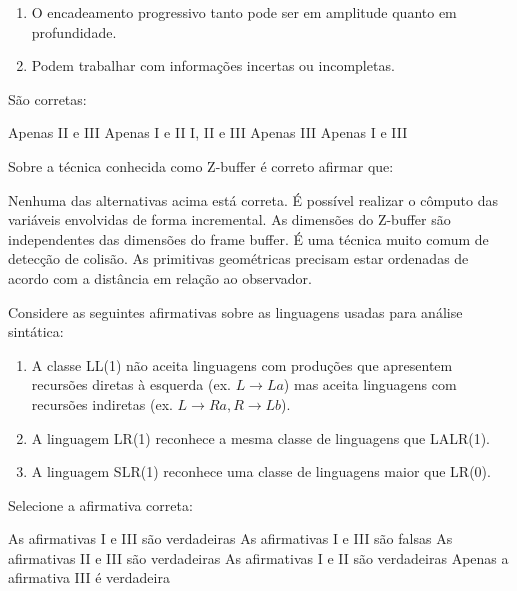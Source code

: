 \documentclass[12pt, addpoints]{exam}
\begin{document}
\begin{questions}
\begin{enumerate}[label=\Roman*.]
    \item O encadeamento progressivo tanto pode ser em amplitude quanto em profundidade.

    \item Podem trabalhar com informações incertas ou incompletas. 

\end{enumerate}

São corretas:
\begin{choices}
\choice Apenas II e III
\choice Apenas I e II
\choice I, II e III
\choice Apenas III
\choice Apenas I e III
\end{choices}

\question

Sobre a técnica conhecida como Z-buffer é correto afirmar que:
\begin{choices}
\choice Nenhuma das alternativas acima está correta. 
\choice É possível realizar o cômputo das variáveis envolvidas de forma incremental.
\choice As dimensões do Z-buffer são independentes das dimensões do frame buffer. 
\choice É uma técnica muito comum de detecção de colisão. 
\choice As primitivas geométricas precisam estar ordenadas de acordo com a distância em relação ao observador. 
\end{choices}

\question

Considere as seguintes afirmativas sobre as linguagens usadas para análise sintática:

\begin{enumerate}[label=\Roman*.]

    \item A classe LL(1) não aceita linguagens com produções que apresentem recursões diretas à esquerda (ex. \(L \rightarrow La\)) mas aceita linguagens com recursões indiretas (ex. \(L \rightarrow Ra, R \rightarrow Lb\)).

    \item A linguagem LR(1) reconhece a mesma classe de linguagens que LALR(1).

    \item A linguagem SLR(1) reconhece uma classe de linguagens maior que LR(0).

\end{enumerate}

Selecione a afirmativa correta:
\begin{choices}
\choice As afirmativas I e III são verdadeiras
\choice As afirmativas I e III são falsas
\choice As afirmativas II e III são verdadeiras
\choice As afirmativas I e II são verdadeiras
\choice Apenas a afirmativa III é verdadeira
\end{choices}


\end{questions}
\end{document}
